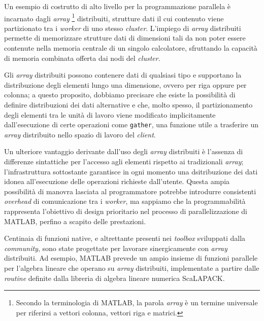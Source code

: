 Un esempio di costrutto di alto livello per la programmazione parallela \`e incarnato dagli \textit{array}
\footnote{Secondo la terminologia di MATLAB, la parola \textit{array} \`e un termine universale per riferirsi a vettori colonna, vettori riga e matrici.} 
distribuiti, strutture dati il cui contenuto viene partizionato tra i \textit{worker} di uno stesso \textit{cluster}.\newline
L'impiego di \textit{array} distribuiti permette di memorizzare strutture dati di dimensioni tali da non poter essere contenute nella memoria centrale di un 
singolo calcolatore, sfruttando la capacit\`a di memoria combinata offerta dai nodi del \textit{cluster}.

Gli \textit{array} distribuiti possono contenere dati di qualsiasi tipo e supportano la distribuzione degli elementi lungo una dimensione, ovvero 
per riga oppure per colonna; a questo proposito, dobbiamo precisare che esiste la possibilit\`a di definire distribuzioni dei dati alternative e che, molto spesso, il partizionamento degli elementi tra le unit\`a di lavoro viene modificato implicitamente dall'esecuzione di certe operazioni 
come \lstinline|gather|, una funzione utile a trasferire un \textit{array} distribuito nello spazio di lavoro del \textit{client}.

Un ulteriore vantaggio derivante dall'uso degli \textit{array} distribuiti \`e l'assenza di differenze sintattiche per l'accesso agli elementi rispetto ai 
tradizionali \textit{array}; l'infrastruttura sottostante garantisce in ogni momento una dsitribuzione dei dati idonea all'esecuzione delle operazioni 
richieste dall'utente.\newline
Questa ampia possibilit\`a di manovra lasciata al programmatore potrebbe introdurre consistenti \textit{overhead} di comunicazione tra i \textit{worker}, 
ma sappiamo che la programmabilit\`a rappresenta l'obiettivo di design prioritario nel processo di parallelizzazione di MATLAB, perfino a scapito delle prestazioni.

Centinaia di funzioni native, e altrettante presenti nei \textit{toolbox} sviluppati dalla \textit{community}, sono state progettate per lavorare sinergicamente con \textit{array} distribuiti.\newline
Ad esempio, MATLAB prevede un ampio insieme di funzioni parallele per l'algebra lineare che operano su \textit{array} distribuiti, implementate a partire dalle \textit{routine} definite dalla libreria di algebra lineare numerica ScaLAPACK.